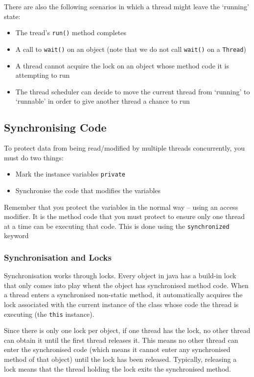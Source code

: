 There are also the following scenarios in which a thread might leave the 
`running' state:
\begin{itemize}
    \item The tread's \verb#run()# method completes
    \item A call to \verb#wait()# on an object (note that we do not call 
    \verb#wait()# on a \verb#Thread#)
    \item A thread cannot acquire the lock on an object whose method code it is 
    attempting to run
    \item The thread scheduler can decide to move the current thread from 
    `running' to `runnable' in order to give another thread a chance to run
\end{itemize}

\subsection{Synchronising Code}
To protect data from being read/modified by multiple threads concurrently, you 
must do two things:
\begin{itemize}
    \item Mark the instance variables \verb#private#
    \item Synchronise the code that modifies the variables
\end{itemize}
Remember that you protect the variables in the normal way -- using an access 
modifier. It is the method code that you must protect to ensure only one thread 
at a time can be executing that code. This is done using the 
\verb#synchronized# keyword

\subsubsection{Synchronisation and Locks}
Synchronisation works through locks. Every object in java has a build-in lock 
that only comes into play whent the object has synchronised method code. When a 
thread enters a synchronised non-static method, it automatically acquires the 
lock associated with the current instance of the class whose code the thread is 
executing (the \verb#this# instance).

Since there is only one lock per object, if one thread has the lock, no other 
thread can obtain it until the first thread releases it. This means no other 
thread can enter the synchronised code (which means it cannot enter any 
synchronised method of that object) until the lock has been released.  
Typically, releasing a lock means that the thread holding the lock exits the 
synchronised method.

